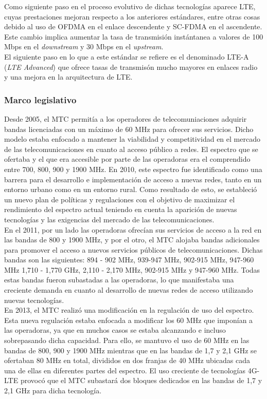 Como siguiente paso en el proceso evolutivo de dichas tecnologías aparece LTE, cuyas prestaciones mejoran respecto a los anteriores estándares, entre otras cosas debido al uso de OFDMA en el enlace descendente y SC-FDMA en el ascendente. Este cambio implica aumentar la tasa de transmisión instántanea a valores de 100 Mbps en el \textit{downstream} y 30 Mbps en el \textit{upstream}.\\

El siguiente paso en lo que a este estándar se refiere es el denominado LTE-A (\textit{LTE Advanced}) que ofrece tasas de transmisón mucho mayores en enlaces radio y una mejora en la arquitectura de LTE.

\subsubsection{Marco legislativo}
Desde 2005, el MTC permitía a los operadores de telecomuniaciones adquirir bandas licenciadas con un máximo de 60 MHz para ofrecer sus servicios. Dicho modelo estaba enfocado a mantener la viabilidad y competitividad en el mercado de las telecomunicaciones en cuanto al acceso público a redes. El espectro que se ofertaba y el que era accesible por parte de las operadoras era el comprendido entre 700, 800, 900 y 1900 MHz. En 2010, este espectro fue identificado como una barrera para el desarrollo e implementación de acceso a nuevas redes, tanto en un entorno urbano como en un entorno rural. Como resultado de esto, se estableció un nuevo plan de políticas y regulaciones con el objetivo de maximizar el rendimiento del espectro actual teniendo en cuenta la aparición de nuevas tecnologías y las exigencias del mercado de las telecomunicaciones.\\

En el 2011, por un lado las operadoras ofrecían sus servicios de acceso a la red en las bandas de 800 y 1900 MHz, y por el otro, el MTC alojaba bandas adicionales para promover el acceso a nuevos servicios públicos de telecomunicaciones. Dichas bandas son las siguientes: 894 - 902 MHz, 939-947 MHz, 902-915 MHz, 947-960 MHz 1,710 - 1,770 GHz, 2,110 - 2,170 MHz, 902-915 MHz y 947-960 MHz. Todas estas bandas fueron subastadas a las operadoras, lo que manifestaba una creciente demanda en cuanto al desarrollo de nuevas redes de acceso utilizando nuevas tecnologías.\\

En 2013, el MTC realizó una modificación en la regulación de uso del espectro. Esta nueva regulación estaba enfocada a modificar los 60 MHz que imponían a las operadoras, ya que en muchos casos se estaba alcanzando e incluso sobrepasando dicha capacidad. Para ello, se mantuvo el uso de 60 MHz en las bandas de 800, 900 y 1900 MHz mientras que en las bandas de 1,7 y 2,1 GHz se ofertaban 80 MHz en total, divididos en dos franjas de 40 MHz ubicadas cada una de ellas en diferentes partes del espectro. El uso creciente de tecnologías 4G-LTE provocó que el MTC subastará dos bloques dedicados en las bandas de 1,7 y 2,1 GHz para dicha tecnología.

